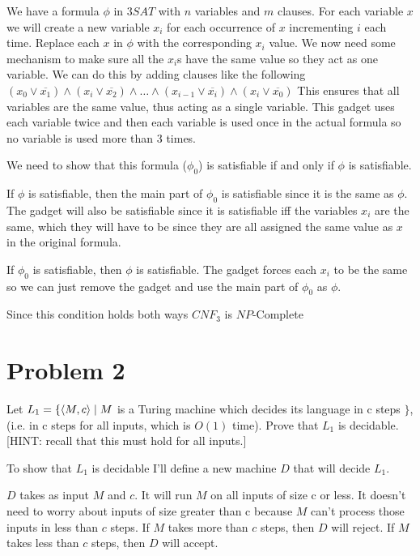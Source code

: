 \documentclass[12pt]{article}
\begin{document}
We have a formula $\phi$ in $3SAT$ with $n$ variables and $m$ clauses. For each variable $x$ we will create a new variable $x_i$ for each occurrence of $x$ incrementing $i$ each time. Replace each $x$ in $\phi$ with the corresponding $x_i$ value. We now need some mechanism to make sure all the $x_i$s have the same value so they act as one variable. We can do this by adding clauses like the following $ (x_0 \lor \overline{x_1}) \land (x_i \lor \overline{x_2}) \land \dots \land (x_{i-1} \lor \overline{x_i}) \land (x_i \lor \overline{x_{0}})$ This ensures that all variables are the same value, thus acting as a single variable. This gadget uses each variable twice and then each variable is used once in the actual formula so no variable is used more than 3 times.

We need to show that this formula ($\phi_0$) is satisfiable if and only if $\phi$ is satisfiable.

If $\phi$ is satisfiable, then the main part of $\phi_0$ is satisfiable since it is the same as $\phi$. The gadget will also be satisfiable since it is satisfiable iff the variables $x_i$ are the same, which they will have to be since they are all assigned the same value as $x$ in the original formula.

If $\phi_0$ is satisfiable, then $\phi$ is satisfiable. The gadget forces each $x_i$ to be the same so we can just remove the gadget and use the main part of $\phi_0$ as $\phi$.

Since this condition holds both ways $CNF_3$ is $NP$-Complete


\section*{Problem 2}

\begin{questionbox}
	Let $L_1 = \{ \braket{M,c} \mid M$ is a Turing machine which decides its language in c steps $\}$, (i.e. in c
	steps for all inputs, which is $O(1)$ time). Prove that $L_1$ is decidable. [HINT: recall that this
	must hold for all inputs.]
\end{questionbox}

To show that $L_1$ is decidable I'll define a new machine $D$ that will decide $L_1$.

$D$ takes as input $M$ and $c$. It will run $M$ on all inputs of size c or less. It doesn't need to worry about inputs of size greater than c because $M$ can't process those inputs in less than $c$ steps. If $M$ takes more than $c$ steps, then $D$ will reject. If $M$ takes less than $c$ steps, then $D$ will accept.
\end{document}
